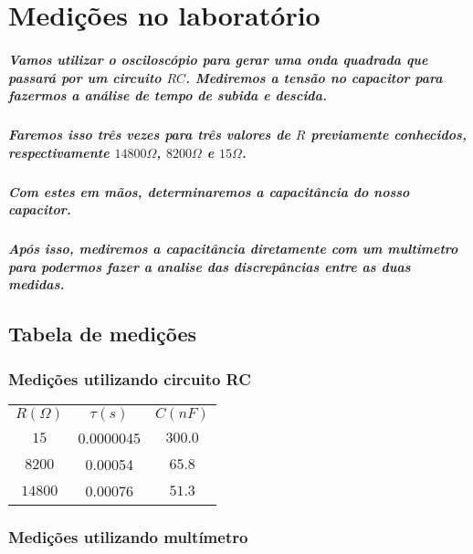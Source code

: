 \documentclass[12pt,twoside, a4paper, twocolumn]{article}
\begin{document}
\section{Medições no laboratório}

\subparagraph*{Vamos utilizar o osciloscópio para gerar uma onda quadrada que passará por um circuito $RC$. Mediremos a tensão no capacitor para fazermos a análise de tempo de subida e descida.}

\subparagraph*{Faremos isso três vezes para três valores de $R$ previamente conhecidos, respectivamente $14800 \varOmega$, $8200 \varOmega$ e $15 \varOmega$.}

\subparagraph*{Com estes em mãos, determinaremos a capacitância do nosso capacitor.}

\subparagraph*{Após isso, mediremos a capacitância diretamente com um multimetro para podermos fazer a analise das discrepâncias entre as duas medidas.}

\subsection{Tabela de medições}

\subsubsection{Medições utilizando circuito RC}

\begin{center}
    \begin{tabular}{ |c|c|c| }
        \hline
        $R (\varOmega)$ & $\tau (s)$ & $C (nF)$  \\
        $15$          & 0.0000045  & $300.0$ \\
        $8200$        & 0.00054    & $65.8$  \\
        $14800$       & 0.00076    & $51.3$  \\
        \hline
    \end{tabular}
\end{center}


\subsubsection{Medições utilizando multímetro}
\end{document}
